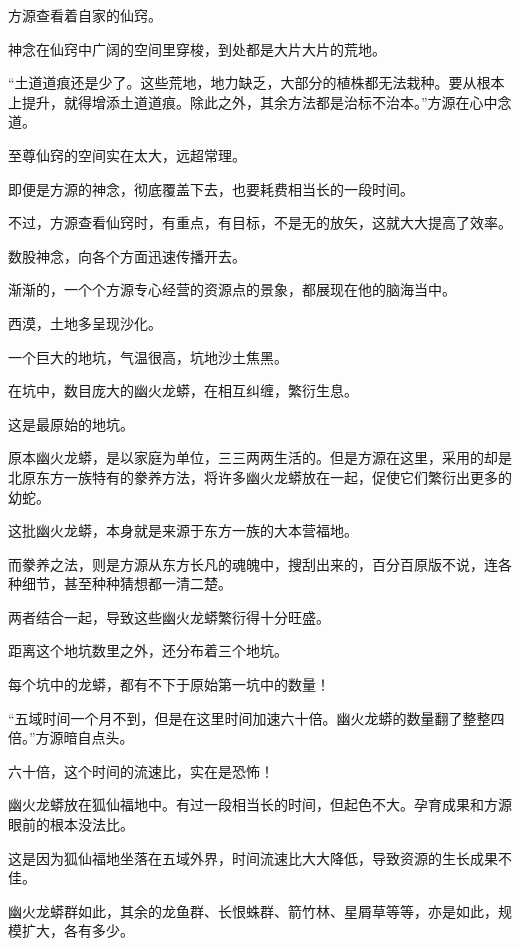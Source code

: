 
\begin{this_body}

方源查看着自家的仙窍。

神念在仙窍中广阔的空间里穿梭，到处都是大片大片的荒地。

“土道道痕还是少了。这些荒地，地力缺乏，大部分的植株都无法栽种。要从根本上提升，就得增添土道道痕。除此之外，其余方法都是治标不治本。”方源在心中念道。

至尊仙窍的空间实在太大，远超常理。

即便是方源的神念，彻底覆盖下去，也要耗费相当长的一段时间。

不过，方源查看仙窍时，有重点，有目标，不是无的放矢，这就大大提高了效率。

数股神念，向各个方面迅速传播开去。

渐渐的，一个个方源专心经营的资源点的景象，都展现在他的脑海当中。

西漠，土地多呈现沙化。

一个巨大的地坑，气温很高，坑地沙土焦黑。

在坑中，数目庞大的幽火龙蟒，在相互纠缠，繁衍生息。

这是最原始的地坑。

原本幽火龙蟒，是以家庭为单位，三三两两生活的。但是方源在这里，采用的却是北原东方一族特有的豢养方法，将许多幽火龙蟒放在一起，促使它们繁衍出更多的幼蛇。

这批幽火龙蟒，本身就是来源于东方一族的大本营福地。

而豢养之法，则是方源从东方长凡的魂魄中，搜刮出来的，百分百原版不说，连各种细节，甚至种种猜想都一清二楚。

两者结合一起，导致这些幽火龙蟒繁衍得十分旺盛。

距离这个地坑数里之外，还分布着三个地坑。

每个坑中的龙蟒，都有不下于原始第一坑中的数量！

“五域时间一个月不到，但是在这里时间加速六十倍。幽火龙蟒的数量翻了整整四倍。”方源暗自点头。

六十倍，这个时间的流速比，实在是恐怖！

幽火龙蟒放在狐仙福地中。有过一段相当长的时间，但起色不大。孕育成果和方源眼前的根本没法比。

这是因为狐仙福地坐落在五域外界，时间流速比大大降低，导致资源的生长成果不佳。

幽火龙蟒群如此，其余的龙鱼群、长恨蛛群、箭竹林、星屑草等等，亦是如此，规模扩大，各有多少。


\end{this_body}
